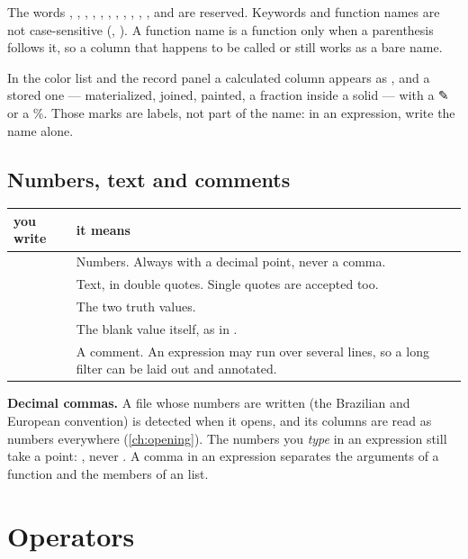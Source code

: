 The words , , , , , ,
, , , , ,  and 
are reserved. Keywords and function names are not case-sensitive (, ). A
function name is a function only when a parenthesis follows it, so a column that happens to be
called  or  still works as a bare name.

In the color list and the record panel a calculated column appears as , and a stored
one — materialized, joined, painted, a fraction inside a solid — with a ✎ or a \%. Those marks
are labels, not part of the name: in an expression, write the name alone.

\subsection{Numbers, text and comments}\label{sec:expr-literals}

\begin{tabularx}{\linewidth}{@{}p{42mm}L@{}}
\toprule
you write & it means \\
\midrule
{} \;  \;  \;  & Numbers. Always with a decimal point, never
  a comma. \\
 & Text, in double quotes. Single quotes are accepted too. \\
 \;  & The two truth values. \\
 & The blank value itself, as in . \\
 & A comment. An expression may run over several lines, so a long
  filter can be laid out and annotated. \\
\bottomrule
\end{tabularx}

\begin{note}
\textbf{Decimal commas.} A file whose numbers are written  (the Brazilian and European
convention) is detected when it opens, and its columns are read as numbers everywhere
(\cref{ch:opening}). The numbers you \emph{type} in an expression still take a point:
, never . A comma in an expression separates the arguments of a
function and the members of an  list.
\end{note}

\section{Operators}\label{sec:expr-operators}

